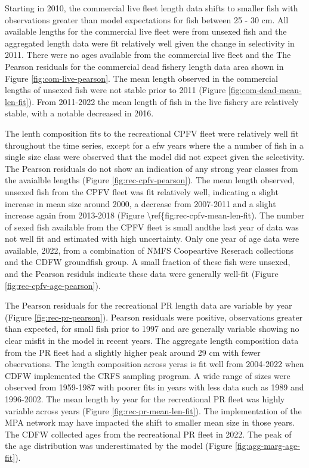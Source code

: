 \documentclass[11pt,
  english,
  letterpaper,
]{article}
\begin{document}
Starting in 2010, the commercial live fleet length data shifts to smaller fish with observations greater than model expectations for fish between 25 - 30 cm. All available lengths for the commercial live fleet were from unsexed fish and the aggregated length data were fit relatively well given the change in selectivity in 2011. There were no ages available from the commercial live fleet and the The Pearson residuals for the commercial dead fishery length data area shown in Figure \ref{fig:com-live-pearson}. The mean length observed in the commercial lengths of unsexed fish were not stable prior to 2011 (Figure \ref{fig:com-dead-mean-len-fit}). From 2011-2022 the mean length of fish in the live fishery are relatively stable, with a notable decreased in 2016.

The lenth composition fits to the recreational CPFV fleet were relatively well fit throughout the time series, except for a efw years where the a number of fish in a single size class were observed that the model did not expect given the selectivity. The Pearson residuals do not show an indication of any strong year classes from the avaialble lengths (Figure \ref{fig:rec-cpfv-pearson}). The mean length observed, unsexed fish from the CPFV fleet was fit relatively well, indicating a slight increase in mean size around 2000, a decrease from 2007-2011 and a slight increase again from 2013-2018 (Figure \textbackslash ref\{fig:rec-cpfv-mean-len-fit). The number of sexed fish available from the CPFV fleet is small andthe last year of data was not well fit and estimated with high uncertainty. Only one year of age data were available, 2022, from a combination of NMFS Coopeartive Reserach collections and the CDFW groundfish group. A small fraction of these fish were unsexed, and the Pearson residuls indicate these data were generally well-fit (Figure \ref{fig:rec-cpfv-age-pearson}).

The Pearson residuals for the recreational PR length data are variable by year (Figure \ref{fig:rec-pr-pearson}). Pearson residuals were positive, observations greater than expected, for small fish prior to 1997 and are generally variable showing no clear misfit in the model in recent years. The aggregate length composition data from the PR fleet had a slightly higher peak around 29 cm with fewer observations. The length composition across yeras is fit well from 2004-2022 when CDFW implemented the CRFS sampling program. A wide range of sizes were observed from 1959-1987 with poorer fits in years with less data such as 1989 and 1996-2002. The mean length by year for the recreational PR fleet was highly variable across years (Figure \ref{fig:rec-pr-mean-len-fit}). The implementation of the MPA network may have impacted the shift to smaller mean size in those years. The CDFW collected ages from the recreational PR fleet in 2022. The peak of the age distribution was underestimated by the model (Figure \ref{fig:agg-marg-age-fit}).
\end{document}
